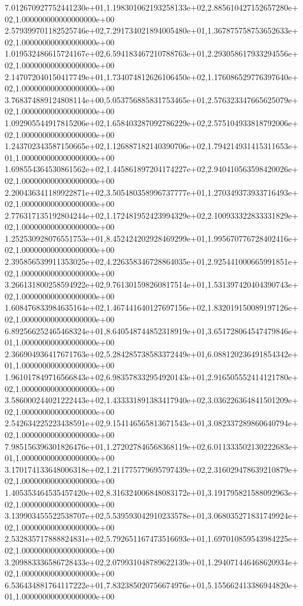7.012670927752441230e+01,1.198301062193258133e+02,2.885610427152657280e+02,1.000000000000000000e+00
2.579399701182525746e+02,7.291734021894005480e+01,1.367875758753652633e+02,1.000000000000000000e+00
1.019532486615724167e+02,6.594183467210788763e+01,2.293058617933294556e+02,1.000000000000000000e+00
2.147072040150417749e+01,1.734074812626106450e+02,1.176086529776397640e+02,1.000000000000000000e+00
3.768374889124808114e+00,5.053756885831753465e+01,2.576323347665625079e+02,1.000000000000000000e+00
1.092905544917815206e+02,1.658403287092786229e+02,2.575104933818792006e+02,1.000000000000000000e+00
1.243702343587150665e+02,1.126887182140390706e+02,1.794214931415311653e+01,1.000000000000000000e+00
1.698554364530861562e+02,1.445861897204174227e+02,2.940410563598420026e+02,1.000000000000000000e+00
2.200436341189922871e+02,3.505480358996737777e+01,1.270349373933716493e+02,1.000000000000000000e+00
2.776317135192804244e+02,1.172481952423994329e+02,2.100933322833331829e+02,1.000000000000000000e+00
1.252530928076551753e+01,8.452424202928469299e+01,1.995670776728402416e+02,1.000000000000000000e+00
2.395856539911353025e+02,4.226358346728864035e+01,2.925441000665991851e+02,1.000000000000000000e+00
3.266131800258594922e+02,9.761301598260817514e+01,1.531397420404390743e+02,1.000000000000000000e+00
1.608476833984635164e+02,1.467441640127697156e+02,1.832019150089197126e+02,1.000000000000000000e+00
6.892566252465468324e+01,8.640548744852318919e+01,3.651728064547479846e+01,1.000000000000000000e+00
2.366904936417671763e+02,5.284285738583372449e+01,6.088120236491854342e+01,1.000000000000000000e+00
1.961017849716566843e+02,6.983578332954920143e+01,2.916505552414121780e+02,1.000000000000000000e+00
3.586000244021222443e+02,1.433331891383417940e+02,3.036226364841501209e+02,1.000000000000000000e+00
2.542634225223438591e+02,9.154146565813671543e+01,3.082337289860640794e+02,1.000000000000000000e+00
7.985156396301826476e+01,1.272027846568368119e+02,6.011333502130222683e+01,1.000000000000000000e+00
3.170174133648006318e+02,1.211775779695797439e+02,2.316029478639210879e+02,1.000000000000000000e+00
1.405353464535457420e+02,8.316324006848083172e+01,3.191795821588092963e+02,1.000000000000000000e+00
3.139903455522538707e+02,5.539593042910233578e+01,3.068035271831749924e+02,1.000000000000000000e+00
2.532835717888824831e+02,5.792651167473516693e+01,1.697010859543984225e+02,1.000000000000000000e+00
3.209883336586728433e+02,2.079931048789622139e+01,1.294071446468620934e+02,1.000000000000000000e+00
6.536434881764117222e+01,7.832385020756674976e+01,5.155662413386944820e+01,1.000000000000000000e+00
